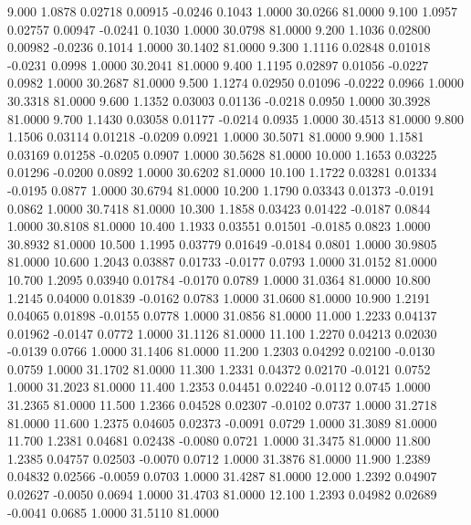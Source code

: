    9.000   1.0878   0.02718   0.00915  -0.0246   0.1043   1.0000  30.0266  81.0000
   9.100   1.0957   0.02757   0.00947  -0.0241   0.1030   1.0000  30.0798  81.0000
   9.200   1.1036   0.02800   0.00982  -0.0236   0.1014   1.0000  30.1402  81.0000
   9.300   1.1116   0.02848   0.01018  -0.0231   0.0998   1.0000  30.2041  81.0000
   9.400   1.1195   0.02897   0.01056  -0.0227   0.0982   1.0000  30.2687  81.0000
   9.500   1.1274   0.02950   0.01096  -0.0222   0.0966   1.0000  30.3318  81.0000
   9.600   1.1352   0.03003   0.01136  -0.0218   0.0950   1.0000  30.3928  81.0000
   9.700   1.1430   0.03058   0.01177  -0.0214   0.0935   1.0000  30.4513  81.0000
   9.800   1.1506   0.03114   0.01218  -0.0209   0.0921   1.0000  30.5071  81.0000
   9.900   1.1581   0.03169   0.01258  -0.0205   0.0907   1.0000  30.5628  81.0000
  10.000   1.1653   0.03225   0.01296  -0.0200   0.0892   1.0000  30.6202  81.0000
  10.100   1.1722   0.03281   0.01334  -0.0195   0.0877   1.0000  30.6794  81.0000
  10.200   1.1790   0.03343   0.01373  -0.0191   0.0862   1.0000  30.7418  81.0000
  10.300   1.1858   0.03423   0.01422  -0.0187   0.0844   1.0000  30.8108  81.0000
  10.400   1.1933   0.03551   0.01501  -0.0185   0.0823   1.0000  30.8932  81.0000
  10.500   1.1995   0.03779   0.01649  -0.0184   0.0801   1.0000  30.9805  81.0000
  10.600   1.2043   0.03887   0.01733  -0.0177   0.0793   1.0000  31.0152  81.0000
  10.700   1.2095   0.03940   0.01784  -0.0170   0.0789   1.0000  31.0364  81.0000
  10.800   1.2145   0.04000   0.01839  -0.0162   0.0783   1.0000  31.0600  81.0000
  10.900   1.2191   0.04065   0.01898  -0.0155   0.0778   1.0000  31.0856  81.0000
  11.000   1.2233   0.04137   0.01962  -0.0147   0.0772   1.0000  31.1126  81.0000
  11.100   1.2270   0.04213   0.02030  -0.0139   0.0766   1.0000  31.1406  81.0000
  11.200   1.2303   0.04292   0.02100  -0.0130   0.0759   1.0000  31.1702  81.0000
  11.300   1.2331   0.04372   0.02170  -0.0121   0.0752   1.0000  31.2023  81.0000
  11.400   1.2353   0.04451   0.02240  -0.0112   0.0745   1.0000  31.2365  81.0000
  11.500   1.2366   0.04528   0.02307  -0.0102   0.0737   1.0000  31.2718  81.0000
  11.600   1.2375   0.04605   0.02373  -0.0091   0.0729   1.0000  31.3089  81.0000
  11.700   1.2381   0.04681   0.02438  -0.0080   0.0721   1.0000  31.3475  81.0000
  11.800   1.2385   0.04757   0.02503  -0.0070   0.0712   1.0000  31.3876  81.0000
  11.900   1.2389   0.04832   0.02566  -0.0059   0.0703   1.0000  31.4287  81.0000
  12.000   1.2392   0.04907   0.02627  -0.0050   0.0694   1.0000  31.4703  81.0000
  12.100   1.2393   0.04982   0.02689  -0.0041   0.0685   1.0000  31.5110  81.0000
